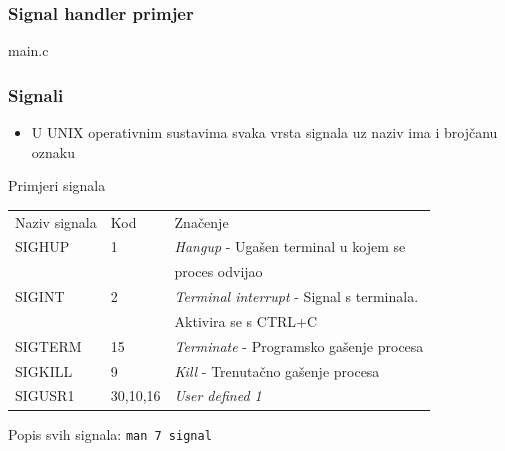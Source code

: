 \documentclass[table,usenames,dvipsnames]{beamer}
\newcommand{\shell}[1]{\texttt{#1}}
\begin{document}

\begin{frame}[t]
	\frametitle{Signal handler primjer}
	\begin{block}{main.c}
		\makeset
	\end{block}
\end{frame}

\begin{frame}[t]
	\frametitle{Signali}
	\begin{itemize}
		\item U UNIX operativnim sustavima svaka vrsta signala uz naziv ima i brojčanu oznaku
	\end{itemize}
	Primjeri signala \\
		\begin{table}[h]
			\begin{tabular}{l l l}
				\rowcolor{BlueViolet!20}Naziv signala & Kod & Značenje \\
				SIGHUP & 1 & \emph{Hangup} - Ugašen terminal u kojem se \\ & & proces odvijao \\
				SIGINT & 2 & \emph{Terminal interrupt} - Signal s terminala. \\ & & Aktivira se s CTRL+C \\
				SIGTERM & 15 & \emph{Terminate} - Programsko gašenje procesa \\
				SIGKILL & 9 & \emph{Kill} - Trenutačno gašenje procesa \\
				SIGUSR1 & 30,10,16 & \emph{User defined 1} 
			\end{tabular}
		\end{table}
	
	Popis svih signala: \shell{man 7 signal}
\end{frame}
\end{document}
